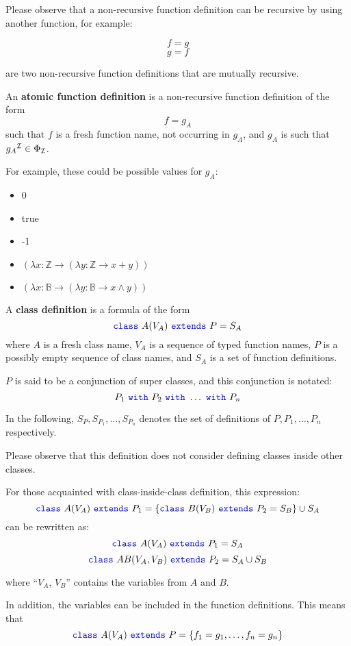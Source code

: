 Please observe that a non-recursive function definition can be recursive by using another function, for example:
\begin{center}
    \[f = g\]
    \[g = f\]
\end{center}
are two non-recursive function definitions that are mutually recursive.

An \textbf{atomic function definition} is a non-recursive function definition of the form
\[f = g_{A}\]
such that $f$ is a fresh function name, not occurring in $g_{A}$, and $g_{A}$ is such that ${g_{A}}^{\mathcal{I}} \in \Phi _{\mathcal{I}}$.

For example, these could be possible values for $g_{A}$:
\begin{itemize}
    \item 0
    \item true
    \item -1
    \item $(\lambda x: \mathbb{Z} \to (\lambda y: \mathbb{Z} \to x + y))$
    \item $(\lambda x: \mathbb{B} \to (\lambda y: \mathbb{B} \to x \land y) )$
\end{itemize}

A \textbf{class definition} is a formula of the form
\[\sodaclass\ A (V_{A}) \ \sodaextends\ P = S_{A}\]
where $A$ is a fresh class name, $V_{A}$ is a sequence of typed function names, $P$ is a possibly empty sequence of class names, and $S_{A}$ is a set of function definitions.

$P$ is said to be a conjunction of super classes, and this conjunction is notated:
\[P_{1} \ \sodawith\ P_{2} \ \sodawith\ \ldots \ \sodawith\ P_{n}\]

In the following, $S_{P}, S_{P_{1}}, \ldots , S_{P_{n}}$ denotes the set of definitions of $P, P_{1}, \ldots, P_{n}$ respectively.

Please observe that this definition does not consider defining classes inside other classes.

For those acquainted with class-inside-class definition, this expression:
\[\sodaclass\ A (V_{A}) \ \sodaextends\ P_{1} = \{
\sodaclass\ B (V_{B}) \ \sodaextends\ P_{2} = S_{B} \} \cup S_{A}
\]
can be rewritten as:
\[\sodaclass\ A (V_{A}) \ \sodaextends\ P_{1} = S_{A}
\]
\[\sodaclass\ AB (V_{A}, V_{B}) \ \sodaextends\ P_{2} = S_{A} \cup S_{B}
\]

where ``$V_{A}$, $V_{B}$'' contains the variables from $A$ and $B$.

In addition, the variables can be included in the function definitions.
This means that
\[\sodaclass\ A (V_{A}) \ \sodaextends\ P = \{
f_{1} = g_{1},
\ldots ,
f_{n} = g_{n}
\}
\]

